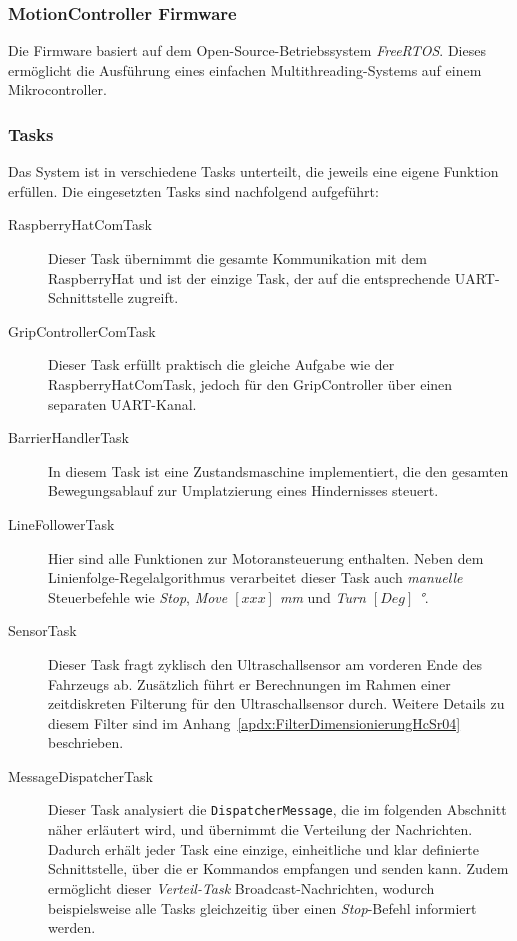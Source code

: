 \documentclass[main.tex]{subfiles} %
\begin{document}

\subsubsection{MotionController Firmware}

Die Firmware basiert auf dem Open-Source-Betriebssystem \textit{FreeRTOS}.
Dieses ermöglicht die Ausführung eines einfachen Multithreading-Systems auf
einem Mikrocontroller.

\subsubsection*{Tasks}

Das System ist in verschiedene Tasks unterteilt, die jeweils eine eigene
Funktion erfüllen. Die eingesetzten Tasks sind nachfolgend aufgeführt:

\begin{description}

    \item[RaspberryHatComTask] Dieser Task übernimmt die gesamte Kommunikation mit dem
        RaspberryHat und ist der einzige Task, der auf die entsprechende
        UART-Schnittstelle zugreift.

    \item[GripControllerComTask] Dieser Task erfüllt praktisch die gleiche Aufgabe wie
        der RaspberryHatComTask, jedoch für den GripController über einen separaten
        UART-Kanal.

    \item[BarrierHandlerTask] In diesem Task ist eine Zustandsmaschine implementiert, die
        den gesamten Bewegungsablauf zur Umplatzierung eines Hindernisses steuert.

    \item[LineFollowerTask] Hier sind alle Funktionen zur Motoransteuerung enthalten.
        Neben dem Linienfolge-Regelalgorithmus verarbeitet dieser Task auch
        \textit{manuelle} Steuerbefehle wie \textit{Stop}, \textit{Move $[xxx]$ mm} und
        \textit{Turn $[Deg]$ °}.

    \item[SensorTask] Dieser Task fragt zyklisch den Ultraschallsensor am vorderen Ende
        des Fahrzeugs ab. Zusätzlich führt er Berechnungen im Rahmen einer
        zeitdiskreten Filterung für den Ultraschallsensor durch. Weitere Details zu
        diesem Filter sind im Anhang~\ref{apdx:FilterDimensionierungHcSr04}
        beschrieben.

    \item[MessageDispatcherTask] Dieser Task analysiert die \texttt{DispatcherMessage},
        die im folgenden Abschnitt näher erläutert wird, und übernimmt die Verteilung
        der Nachrichten. Dadurch erhält jeder Task eine einzige, einheitliche und klar
        definierte Schnittstelle, über die er Kommandos empfangen und senden kann.
        Zudem ermöglicht dieser \textit{Verteil-Task} Broadcast-Nachrichten, wodurch
        beispielsweise alle Tasks gleichzeitig über einen \textit{Stop}-Befehl
        informiert werden.
\end{description}
\end{document}
